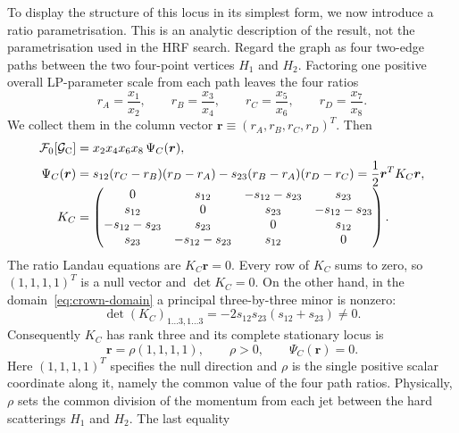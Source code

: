 \documentclass[a4paper,11pt]{article}
\begin{document}
To display the structure of this locus in its simplest form, we now introduce
a ratio parametrisation.  This is an analytic description of the result, not
the parametrisation used in the HRF search.  Regard the graph as four two-edge
paths between the two four-point vertices
\(H_1\) and \(H_2\).  Factoring one positive overall LP-parameter scale from
each path leaves the four ratios
\begin{equation}
 r_A=\frac{x_1}{x_2},\qquad r_B=\frac{x_3}{x_4},\qquad
 r_C=\frac{x_5}{x_6},\qquad r_D=\frac{x_7}{x_8}.
 \label{eq:crown-path-ratios}
\end{equation}
We collect them in the column vector
\(\boldsymbol r\equiv(r_A,r_B,r_C,r_D)^T\).  Then
\begin{align}
 \mathcal F_0[\mathcal G_{\rm C}]
 &=x_2x_4x_6x_8\,\Psi_C(\boldsymbol r),\nonumber\\
 \Psi_C(\boldsymbol r)
 &=s_{12}(r_C-r_B)(r_D-r_A)
   -s_{23}(r_B-r_A)(r_D-r_C)
   =\frac12\boldsymbol r^T K_C\boldsymbol r,
 \label{eq:crown-ratio-quadratic}\\[-1mm]
 K_C&=\begin{pmatrix}
 0&s_{12}&-s_{12}-s_{23}&s_{23}\\
 s_{12}&0&s_{23}&-s_{12}-s_{23}\\
 -s_{12}-s_{23}&s_{23}&0&s_{12}\\
 s_{23}&-s_{12}-s_{23}&s_{12}&0
 \end{pmatrix}.
 \nonumber
\end{align}
The ratio Landau equations are \(K_C\boldsymbol r=0\).  Every row of \(K_C\)
sums to zero, so \((1,1,1,1)^T\) is a null vector and
\(\det K_C=0\).  On the other hand, in the
domain~\eqref{eq:crown-domain} a principal three-by-three minor is nonzero:
\begin{equation}
 \det (K_C)_{1\ldots3,1\ldots3}
 =-2s_{12}s_{23}(s_{12}+s_{23})\ne0.
 \label{eq:crown-ratio-rank}
\end{equation}
Consequently \(K_C\) has rank three and its complete stationary locus is
\begin{equation}
 \boldsymbol r=\rho(1,1,1,1),\qquad \rho>0,
 \qquad \Psi_C(\boldsymbol r)=0.
 \label{eq:crown-ratio-stationarity}
\end{equation}
Here \((1,1,1,1)^T\) specifies the null direction and \(\rho\) is the single
positive scalar coordinate along it, namely the common value of the four path
ratios.  Physically, \(\rho\) sets the common division of the momentum from
each jet between the hard scatterings \(H_1\) and \(H_2\).  The last equality
\end{document}
